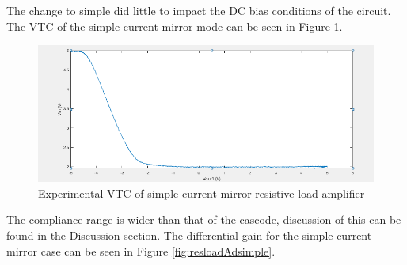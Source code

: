 The change to simple did little to impact the DC bias conditions of the circuit. The VTC of the simple current mirror mode can be seen in Figure \ref{fig:VTCsimple}.
\begin{figure}[H]
    \begin{center}
    \includegraphics[scale=.45]{ExperimentalImplementation/VTC_res_cascode.png}
    \caption{Experimental VTC of simple current mirror resistive load amplifier}
    \label{fig:VTCsimple}
    \end{center}
\end{figure}
The compliance range is wider than that of the cascode, discussion of this can be found in the Discussion section. The differential gain for the simple current mirror case can be seen in Figure \ref{fig:resloadAdsimple}.

